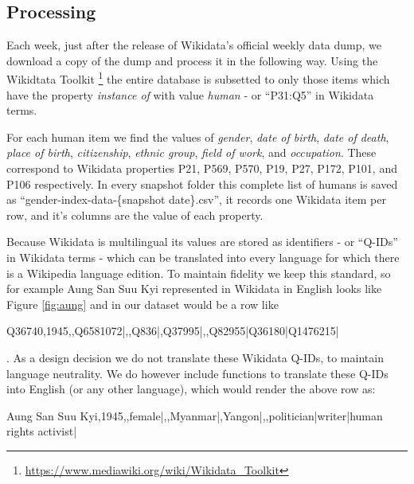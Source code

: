 \documentclass[letterpaper]{article}
\begin{document}
\subsection{Processing}
Each week, just after the release of Wikidata's official weekly data dump, we download a copy of the dump and process it in the following way. Using the Wikidtata Toolkit \footnote{\url{https://www.mediawiki.org/wiki/Wikidata_Toolkit}} the entire database is subsetted to only those items which have the property \textit{instance of} with value \textit{human} - or ``P31:Q5'' in Wikidata terms.

For each human item we find the values of \textit{gender}, \textit{date of birth}, \textit{date of death}, \textit{place of birth}, \textit{citizenship}, \textit{ethnic group}, \textit{field of work}, and \textit{occupation}. These correspond to Wikidata properties P21, P569, P570, P19, P27, P172, P101, and P106 respectively.  In every snapshot folder this complete list of humans is saved as ``gender-index-data-\{snapshot date\}.csv'', it records one Wikidata item per row, and it's columns are the value of each property. 

Because Wikidata is multilingual its values are stored as identifiers - or ``Q-IDs'' in Wikidata terms - which can be translated into every language for which there is a Wikipedia language edition. To maintain fidelity we keep this standard, so for example Aung San Suu Kyi represented in Wikidata in English looks like Figure \ref{fig:aung} and in our dataset would be a row like \begin{small} Q36740,1945,,Q6581072|,,Q836|,Q37995|,,Q82955|Q36180|Q1476215|
\end{small}. As a design decision we do not translate these Wikidata Q-IDs, to maintain language neutrality. We do however include functions to translate these Q-IDs into English (or any other language), which would render the above row as: \\
\begin{small} Aung San Suu Kyi,1945,,female|,,Myanmar|,Yangon|,,politician|writer|human rights activist|
\end{small}
\end{document}
